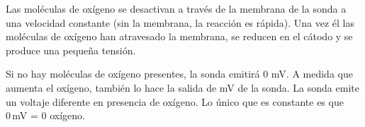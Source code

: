 Las mol\'eculas de oxígeno se desactivan a través de la membrana de la sonda a una velocidad constante (sin la membrana, la reacción es rápida). Una vez \'el las mol\'eculas de ox\'igeno han atravesado la membrana, se reducen en el c\'atodo y se produce una pequeña tensión. 

Si no hay moléculas de oxígeno presentes, la sonda emitirá 0 mV. 
A medida que aumenta el oxígeno, también lo hace la salida de mV de la sonda. La sonda emite un voltaje diferente en presencia de oxígeno. Lo único que es constante es que 0 mV = 0 oxígeno.